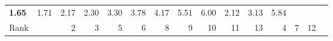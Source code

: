 \begin{tabular}{ll|rrrrrrrrr|rrrr}
  


  
  \textbf{1.65} & 1.71 & 2.17 & 2.30 & 3.30 & 3.78 & 4.17 & 5.51 & 6.00 & 2.12 & 3.13 & 5.84 \\

  Rank & &
  2 & 3 & 5 & 6 & 8 & 9 & 10 & 11 & 13 & 4 & 7 & 12 \\\hline\hline


\end{tabular}
